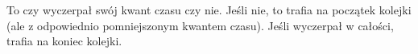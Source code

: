 To czy wyczerpał swój kwant czasu czy nie. Jeśli nie, to trafia na początek kolejki (ale z odpowiednio pomniejszonym kwantem czasu). Jeśli wyczerpał w całości, trafia na koniec kolejki.